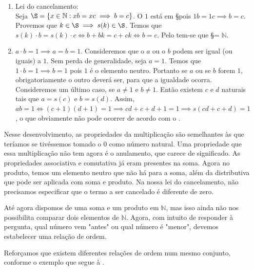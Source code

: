 \documentclass[../main.tex]{subfiles}
\begin{document}
\begin{dem}
\begin{enumerate}[label=(\roman*)]
            
            
        \item Lei do cancelamento: \\
            Seja $\S = \{ x \in \mathbb{N} : xb = xc \implies b = c\}$. O $1$ está em \S pois $1b = 1c \implies b = c$. Provemos que $k\in \S \implies s(k) \in \S$. Temos que $s(k) \cdot b = s(k) \cdot c \iff b + bk = c + ck \iff b = c$. Pelo  tem-se que \S = $\mathbb{N}$.
        \item $a \cdot b = 1 \implies a = b = 1$.
            Consideremos que o $a$ ou o $b$ podem ser igual (ou iguais) a $1$.
            Sem perda de generalidade, seja $a = 1$. Temos que $1 \cdot b = 1 \implies b = 1$ pois $1$ é o elemento neutro. Portanto se $a$ ou se $b$ forem $1$, obrigatoriamente o outro deverá ser, para que a igualdade ocorra.
            Consideremos um último caso, se $a \neq 1$ e $ b \neq 1$. Então existem $c$ e $d$ naturais tais que $a = s(c)$ e $b = s(d)$.
            Assim, $ab=1 \iff (c+1) (d+1) = 1 \implies cd + c + d + 1 = 1 \implies s(cd + c + d) = 1$, o que obviamente não pode ocorrer de acordo com o  .
    \end{enumerate}
\end{dem}

Nesse desenvolvimento, as propriedades da multiplicação são semelhantes às que teríamos se tivéssemos tomado o $0$ como número natural. Uma propriedade que essa multiplicação não tem agora é o anulamento, que carece de significado. As propriedades associativa e comutativa já eram presentes na soma. Agora no produto, temos um elemento neutro que não há para a soma, além da distributiva que pode ser aplicada com soma e produto.
Na nossa lei do cancelamento, não precisamos especificar que o termo a ser cancelado é diferente de zero.


Até agora dispomos de uma soma e um produto em $\mathbb{N}$, mas isso ainda não nos possibilita comparar dois elementos de $\mathbb{N}$. Agora, com intuito de responder à pergunta, qual número vem "antes" ou qual número é "menor", devemos estabelecer uma relação de ordem. 

Reforçamos que existem diferentes relações de ordem num mesmo conjunto, conforme o exemplo que segue à .
\end{document}
